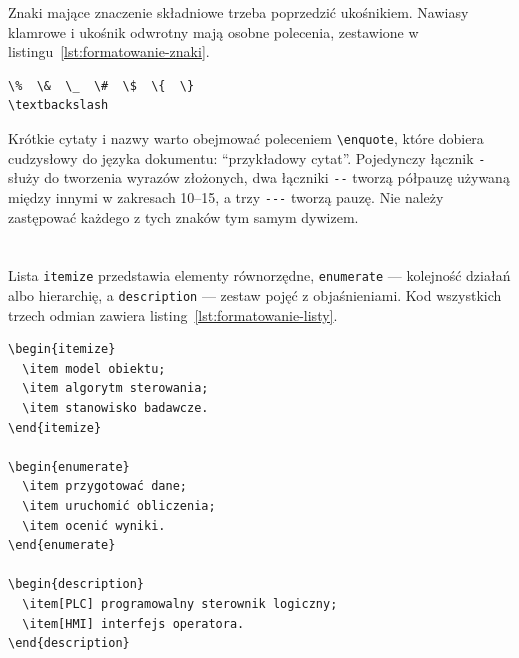 Znaki mające znaczenie składniowe trzeba poprzedzić ukośnikiem. Nawiasy klamrowe i ukośnik odwrotny mają osobne polecenia, zestawione w listingu~\ref{lst:formatowanie-znaki}.

\begin{lstlisting}[style=thesis,caption={Znaki specjalne w zwykłym tekście},label={lst:formatowanie-znaki}]
\%  \&  \_  \#  \$  \{  \}
\textbackslash
\end{lstlisting}

Krótkie cytaty i nazwy warto obejmować poleceniem \verb|\enquote|, które dobiera cudzysłowy do języka dokumentu: \enquote{przykładowy cytat}. Pojedynczy łącznik \verb|-| służy do tworzenia wyrazów złożonych, dwa łączniki \verb|--| tworzą półpauzę używaną między innymi w zakresach \mbox{10--15}, a trzy \verb|---| tworzą pauzę. Nie należy zastępować każdego z tych znaków tym samym dywizem.

\section{}

Lista \texttt{itemize} przedstawia elementy równorzędne, \texttt{enumerate} --- kolejność działań albo hierarchię, a \texttt{description} --- zestaw pojęć z objaśnieniami. Kod wszystkich trzech odmian zawiera listing~\ref{lst:formatowanie-listy}.

\begin{lstlisting}[style=thesis,caption={Trzy podstawowe rodzaje list},label={lst:formatowanie-listy}]
\begin{itemize}
  \item model obiektu;
  \item algorytm sterowania;
  \item stanowisko badawcze.
\end{itemize}

\begin{enumerate}
  \item przygotować dane;
  \item uruchomić obliczenia;
  \item ocenić wyniki.
\end{enumerate}

\begin{description}
  \item[PLC] programowalny sterownik logiczny;
  \item[HMI] interfejs operatora.
\end{description}
\end{lstlisting}

